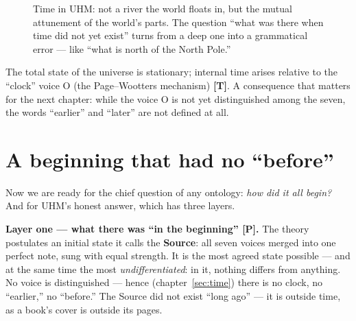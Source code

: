 \documentclass[11pt,letterpaper]{article}
\newcommand{\stT}{\textbf{[T]}\xspace}
\newcommand{\stP}{\textbf{[P]}\xspace}
\begin{document}
\begin{figure}[H]
\centering
{}
\caption{Time in UHM: not a river the world floats in, but the mutual
attunement of the world's parts. The question ``what was there when
time did not yet exist'' turns from a deep one into a grammatical
error --- like ``what is north of the North Pole.''}
\label{fig:time}
\end{figure}

\begin{factbox}[To be precise]
The total state of the universe is stationary; internal time arises
relative to the ``clock'' voice O (the Page--Wootters mechanism)
\stT. A consequence that matters for the next chapter: while the
voice O is not yet distinguished among the seven, the words
``earlier'' and ``later'' are not defined at all.
\end{factbox}

\section{A beginning that had no ``before''}
\label{sec:source}

Now we are ready for the chief question of any ontology: \emph{how did
it all begin?} And for UHM's honest answer, which has three layers.

\textbf{Layer one --- what there was ``in the beginning'' \stP.} The
theory postulates an initial state it calls the \textbf{Source}: all
seven voices merged into one perfect note, sung with equal strength.
It is the most agreed state possible --- and at the same time the most
\emph{undifferentiated}: in it, nothing differs from anything. No
voice is distinguished --- hence (chapter~\ref{sec:time}) there is no
clock, no ``earlier,'' no ``before.'' The Source did not exist ``long
ago'' --- it is outside time, as a book's cover is outside its pages.
\end{document}
